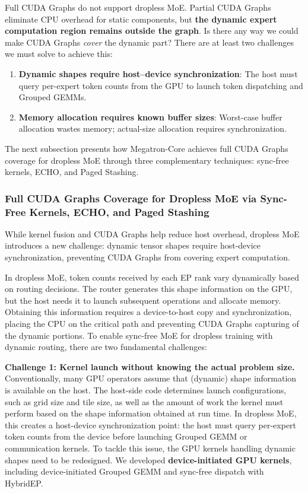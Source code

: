 Full CUDA Graphs do not support dropless MoE. Partial CUDA Graphs eliminate CPU overhead for static components, but \textbf{the dynamic expert computation region remains outside the graph}. Is there any way we could make CUDA Graphs \textit{cover} the dynamic part? There are at least two challenges we must solve to achieve this:
\begin{enumerate}
    \item \textbf{Dynamic shapes require host--device synchronization}: The host must query per-expert token counts from the GPU to launch token dispatching and Grouped GEMMs.
    \item \textbf{Memory allocation requires known buffer sizes}: Worst-case buffer allocation wastes memory; actual-size allocation requires synchronization.
\end{enumerate}

The next subsection presents how Megatron-Core achieves full CUDA Graphs coverage for dropless MoE through three complementary techniques: sync-free kernels, ECHO, and Paged Stashing.

\subsubsection{Full CUDA Graphs Coverage for Dropless MoE via Sync-Free Kernels, ECHO, and Paged Stashing}\label{sec:sync-free-moe}

While kernel fusion and CUDA Graphs help reduce host overhead, dropless MoE introduces a new challenge: dynamic tensor shapes require host-device synchronization, preventing CUDA Graphs from covering expert computation.

In dropless MoE, token counts received by each EP rank vary dynamically based on routing decisions. The router generates this shape information on the GPU, but the host needs it to launch subsequent operations and allocate memory. Obtaining this information requires a device-to-host copy and synchronization, placing the CPU on the critical path and preventing CUDA Graphs capturing of the dynamic portions. To enable sync-free MoE for dropless training with dynamic routing, there are two fundamental challenges:

\textbf{Challenge 1: Kernel launch without knowing the actual problem size.}
Conventionally, many GPU operators assume that (dynamic) shape information is available on the host. The host-side code determines launch configurations, such as grid size and tile size, as well as the amount of work the kernel must perform based on the shape information obtained at run time. In dropless MoE, this creates a host-device synchronization point: the host must query per-expert token counts from the device before launching Grouped GEMM or communication kernels. To tackle this issue, the GPU kernels handling dynamic shapes need to be redesigned. We developed \textbf{device-initiated GPU kernels}, including device-initiated Grouped GEMM and sync-free dispatch with HybridEP.

